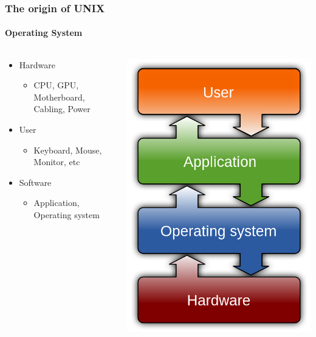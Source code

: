 \documentclass[unknownkeysallowed, 10pt, a4 paper, handout]{beamer}
\begin{document}
\begin{frame}[label=pdp11]
  \frametitle{The origin of UNIX}
  \framesubtitle{Operating System}
  \begin{columns}
    \begin{column}{0.50\textwidth}
      \begin{itemize}
        \item Hardware
      \begin{itemize}
        \item CPU, GPU, Motherboard, Cabling, Power
        \end{itemize}
        \item User
      \begin{itemize}
        \item Keyboard, Mouse, Monitor, etc
        \end{itemize}
        \item Software
      \begin{itemize}
        \item Application, Operating system
        \end{itemize}
      \end{itemize}
    \end{column}
    \begin{column}{0.50\textwidth}
      \begin{center}
        \includegraphics[scale=0.15]{pics/os.png}

\end{center}
\end{column}
\end{columns}
\end{frame}
\end{document}
